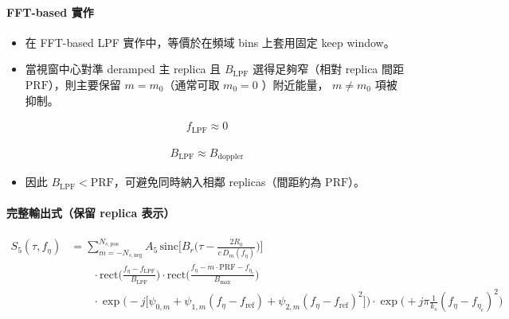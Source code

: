 \documentclass[11pt]{article}
\providecommand{\tightlist}{%
  \setlength{\itemsep}{0pt}\setlength{\parskip}{0pt}}
\begin{document}
\hypertarget{fft-based-ux5be6ux4f5c}{%
\paragraph{FFT-based 實作}\label{fft-based-ux5be6ux4f5c}}

\begin{itemize}
\tightlist
\item
  在 FFT-based LPF 實作中，等價於在頻域 bins 上套用固定 keep window。
\item
  當視窗中心對準 deramped 主 replica 且 \(B_{\mathrm{LPF}}\)
  選得足夠窄（相對 replica 間距 \(\mathrm{PRF}\)），則主要保留
  \(m=m_0\)（通常可取 \(m_0=0\) ）附近能量， \(m\neq m_0\) 項被抑制。
\end{itemize}

\begin{equation}
\begin{aligned}
f_{\mathrm{LPF}}\approx 0
\end{aligned}
\end{equation}

\begin{equation}
\begin{aligned}
B_{\mathrm{LPF}}\approx B_{\mathrm{doppler}}
\end{aligned}
\end{equation}

\begin{itemize}
\tightlist
\item
  因此 \(B_{\mathrm{LPF}}<\mathrm{PRF}\)，可避免同時納入相鄰
  replicas（間距約為 \(\mathrm{PRF}\)）。
\end{itemize}

\hypertarget{ux5b8cux6574ux8f38ux51faux5f0fux4fddux7559-replica-ux8868ux793a}{%
\paragraph{完整輸出式（保留 replica
表示）}\label{ux5b8cux6574ux8f38ux51faux5f0fux4fddux7559-replica-ux8868ux793a}}

\begin{equation}
\begin{aligned}
S_5(\tau,f_\eta)
&=
\sum_{m=-N_{s,\mathrm{neg}}}^{N_{s,\mathrm{pos}}} A_5\,
\mathrm{sinc}\biggl[ B_r\biggl( \tau-\frac{2R_0}{c\,D_m(f_\eta)} \biggr) \biggr]\\
&\qquad \cdot \mathrm{rect}\biggl( \frac{f_\eta-f_{\mathrm{LPF}}}{B_{\mathrm{LPF}}} \biggr)
\cdot \mathrm{rect}\biggl( \frac{f_\eta-m\cdot\mathrm{PRF}-f_{\eta_c}}{B_{\max}} \biggr)\\
&\qquad \cdot \exp\biggl( -j\biggl[ \psi_{0,m}+\psi_{1,m}(f_\eta-f_{\mathrm{ref}})+\psi_{2,m}(f_\eta-f_{\mathrm{ref}})^2 \biggr] \biggr)
\cdot \exp\biggl( +j\pi\frac{1}{k_s}(f_\eta-f_{\eta_c})^2 \biggr)
\end{aligned}
\end{equation}
\end{document}

